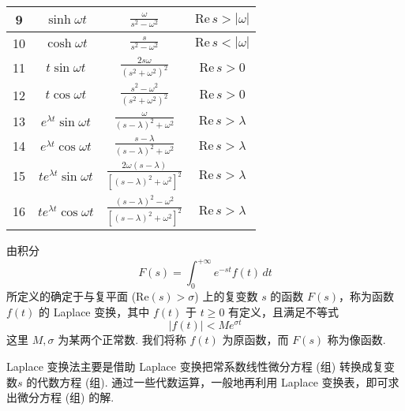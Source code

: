 \begin{table*}[ht!]
\begin{tabular}{c|c|c|c}
        \hline
        9  & $\displaystyle \sinh \omega t$              & $\displaystyle \frac{\omega}{s^2-\omega^2}$                               & $\displaystyle \mathrm{Re}\,s>|\omega|$       \\
        \hline
        10 & $\displaystyle \cosh \omega t$              & $\displaystyle \frac{s}{s^2-\omega^2}$                                    & $\displaystyle \mathrm{Re}\,s<|\omega|$       \\
        \hline
        11 & $\displaystyle t\sin \omega t$              & $\displaystyle \frac{2s\omega}{(s^2+\omega^2)^2}$                         & $\displaystyle \mathrm{Re}\,s>0$              \\
        \hline
        12 & $\displaystyle t\cos \omega t$              & $\displaystyle \frac{s^2-\omega^2}{(s^2+\omega^2)^2}$                     & $\displaystyle \mathrm{Re}\,s>0$              \\
        \hline
        13 & $\displaystyle e^{\lambda t}\sin \omega t$  & $\displaystyle \frac{\omega}{(s-\lambda)^2+\omega^2}$                     & $\displaystyle \mathrm{Re}\,s>\lambda$        \\
        \hline
        14 & $\displaystyle e^{\lambda t}\cos \omega t$  & $\displaystyle \frac{s-\lambda}{(s-\lambda)^2+\omega^2}$                  & $\displaystyle \mathrm{Re}\,s>\lambda$        \\
        \hline
        15 & $\displaystyle te^{\lambda t}\sin \omega t$ & $\displaystyle \frac{2\omega(s-\lambda)}{[(s-\lambda)^2+\omega^2]^2}$     & $\displaystyle \mathrm{Re}\,s>\lambda$        \\
        \hline
        16 & $\displaystyle te^{\lambda t}\cos \omega t$ & $\displaystyle \frac{(s-\lambda)^2-\omega^2}{[(s-\lambda)^2+\omega^2]^2}$ & $\displaystyle \mathrm{Re}\,s>\lambda$        \\
        \hline
    \end{tabular}
\end{table*}

由积分
$$
    F(s)=\int_{0}^{+\infty} e^{ -st  }f(t) \, dt
$$
所定义的确定于与复平面 ($\displaystyle \mathrm{Re} (s)>\sigma$) 上的复变数 $s$ 的函数 $\displaystyle F(s)$，称为函数 $\displaystyle f(t)$ 的 Laplace 变换，其中 $\displaystyle f(t)$ 于 $\displaystyle t\geq0$ 有定义，且满足不等式
$$
    \lvert f(t) \rvert <Me^{ \sigma t }
$$
这里 $\displaystyle M,\sigma$ 为某两个正常数. 我们将称 $\displaystyle f(t)$ 为原函数，而 $\displaystyle F(s)$ 称为像函数.

\begin{note}
    Laplace 变换法主要是借助 Laplace 变换把常系数线性微分方程 (组) 转换成复变数$s$ 的代数方程 (组). 通过一些代数运算，一般地再利用 Laplace 变换表，即可求出微分方程 (组) 的解.
\end{note}

